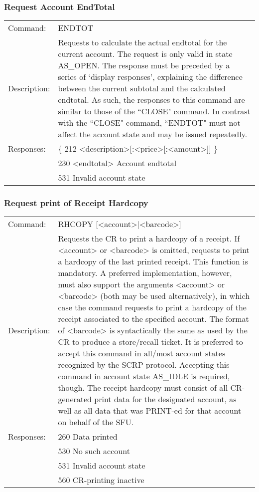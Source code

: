 \subsubsection*{Request Account EndTotal}
\begin{tabular}{lp{350px}}
Command: & ENDTOT \\
Description: & Requests to calculate the actual endtotal for the current account. The request is only valid in state AS\_OPEN. The response must be preceded by a series of `display responses', explaining the difference between the current subtotal and the calculated endtotal. As such, the responses to this command are similar to those of the ``CLOSE" command. In contrast with the ``CLOSE" command, ``ENDTOT" must not affect the account state and may be issued repeatedly. \\
Responses: & \{ 212 <description>[:<price>[:<amount>]] \} \\
& 230 <endtotal> Account endtotal \\
& 531 Invalid account state
\end{tabular}

\subsubsection*{Request print of Receipt Hardcopy}
\begin{tabular}{lp{350px}}
Command: & RHCOPY [<account>|<barcode>] \\
Description: & Requests the CR to print a hardcopy of a receipt. If <account> or <barcode> is omitted, requests to print a hardcopy of the last printed receipt. This function is mandatory. A preferred implementation, however, must also support the arguments <account> or <barcode> (both may be used alternatively), in which case the command requests to print a hardcopy of the receipt associated to the specified account. The format of <barcode> is syntactically the same as used by the CR to produce a store/recall ticket. It is preferred to accept this command in all/most account states recognized by the SCRP protocol. Accepting this command in account state AS\_IDLE is required, though. The receipt hardcopy must consist of all CR-generated print data for the designated account, as well as all data that was PRINT-ed for that account on behalf of the SFU. \\
Responses: & 260 Data printed \\
& 530 No such account \\
& 531 Invalid account state \\
& 560 CR-printing inactive
\end{tabular}

